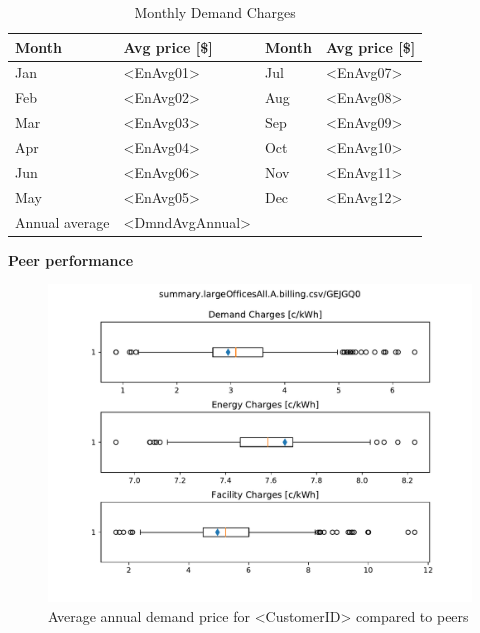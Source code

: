 \documentclass[11pt]{article}
\begin{document}
\lipsum[1][1-7]

\begin{table}[th!]
  \centering
  \caption{Monthly Demand Charges}
  \vspace{1.5ex}
  \label{tab:demand}
  \begin{tabular}{llll}
    Month & Avg price [\$] & Month & Avg price [\$] \\
    \midrule
    Jan & <EnAvg01> & Jul & <EnAvg07> \\
    Feb & <EnAvg02> & Aug & <EnAvg08> \\
    Mar & <EnAvg03> & Sep & <EnAvg09> \\
    Apr & <EnAvg04> & Oct & <EnAvg10> \\
    Jun & <EnAvg06> & Nov & <EnAvg11> \\
    May & <EnAvg05> & Dec & <EnAvg12> \\
    \midrule
    Annual average & <DmndAvgAnnual>
  \end{tabular}
\end{table}

\vspace{3ex}
\textbf{\Large Peer performance}
\vspace{1ex}

\lipsum[1][1-7]

\begin{figure}[!h]
\centering
\includegraphics[width=\columnwidth, page=1, trim=0in 3.8in 0in 0.5in, clip]{visuals/largeOfficesAll.A.whiskercharts.pdf}
\caption{Average annual demand price for <CustomerID> compared to peers}
\label{fig:PeerCompDmnd}
\end{figure}
\end{document}
